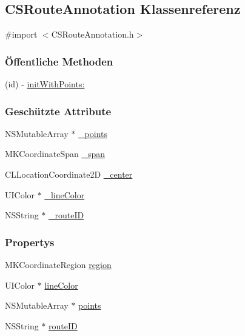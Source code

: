 \hypertarget{interface_c_s_route_annotation}{
\subsection{CSRouteAnnotation Klassenreferenz}
\label{interface_c_s_route_annotation}
}


{\ttfamily \#import $<$CSRouteAnnotation.h$>$}\subsubsection*{Öffentliche Methoden}
\begin{DoxyCompactItemize}
\item 
(id) -\/ \hyperlink{interface_c_s_route_annotation_a8be047ba5640ddb7d10eb9b24c8a10a4}{initWithPoints:}
\end{DoxyCompactItemize}
\subsubsection*{Geschützte Attribute}
\begin{DoxyCompactItemize}
\item 
NSMutableArray $\ast$ \hyperlink{interface_c_s_route_annotation_a975d9e7d09b9150af827aa054e0d19a6}{\_\-points}
\item 
MKCoordinateSpan \hyperlink{interface_c_s_route_annotation_ace21640a062565e3945123770d623a7f}{\_\-span}
\item 
CLLocationCoordinate2D \hyperlink{interface_c_s_route_annotation_aa799ff3d0f0b78f4c58870120fa4e4ac}{\_\-center}
\item 
UIColor $\ast$ \hyperlink{interface_c_s_route_annotation_a84a2b7a56cb528ac237f11812f65b39b}{\_\-lineColor}
\item 
NSString $\ast$ \hyperlink{interface_c_s_route_annotation_a0bf15691d61df903641f20d2ff015792}{\_\-routeID}
\end{DoxyCompactItemize}
\subsubsection*{Propertys}
\begin{DoxyCompactItemize}
\item 
MKCoordinateRegion \hyperlink{interface_c_s_route_annotation_a006eed04181dd41b76f25c171b8e7f99}{region}
\item 
UIColor $\ast$ \hyperlink{interface_c_s_route_annotation_a9c0ec690061a38e929c03ac92f0f7f36}{lineColor}
\item 
NSMutableArray $\ast$ \hyperlink{interface_c_s_route_annotation_ab02d74b832bc93750f3406722fe41d31}{points}
\item 
NSString $\ast$ \hyperlink{interface_c_s_route_annotation_a7f8991c355eb08ae7213b44ed8110f1a}{routeID}
\end{DoxyCompactItemize}



